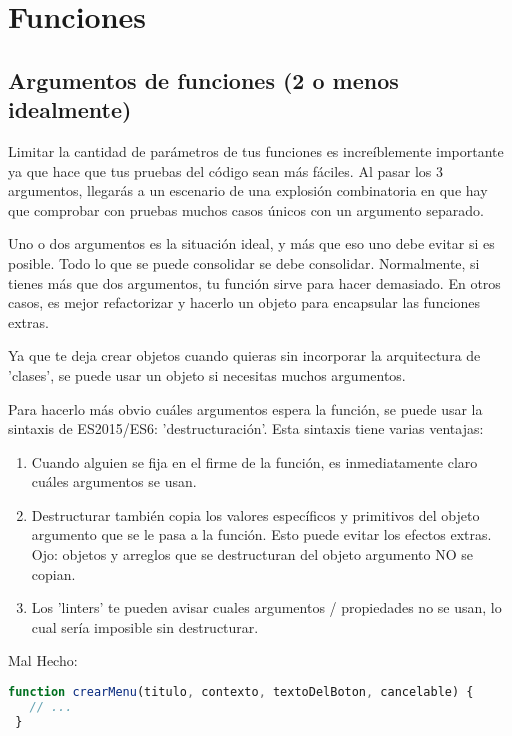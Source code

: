 \section{Funciones}

\subsection*{Argumentos de funciones (2 o menos idealmente)}

Limitar la cantidad de parámetros de tus funciones es increíblemente importante ya que hace que tus pruebas del código sean más fáciles. Al pasar los 3 argumentos, llegarás a un escenario de una explosión combinatoria en que hay que comprobar con pruebas muchos casos únicos con un argumento separado.

Uno o dos argumentos es la situación ideal, y más que eso uno debe evitar si es posible. Todo lo que se puede consolidar se debe consolidar. Normalmente, si tienes más que dos argumentos, tu función sirve para hacer demasiado. En otros casos, es mejor refactorizar y hacerlo un objeto para encapsular las funciones extras.

Ya que  te deja crear objetos cuando quieras sin incorporar la arquitectura de 'clases', se puede usar un objeto si necesitas muchos argumentos.

Para hacerlo más obvio cuáles argumentos espera la función, se puede usar la sintaxis de ES2015/ES6: 'destructuración'. Esta sintaxis tiene varias ventajas:

\begin{enumerate}
  \item Cuando alguien se fija en el firme de la función, es inmediatamente claro cuáles argumentos se usan.
  \item Destructurar también copia los valores específicos y primitivos del objeto argumento que se le pasa a la función. Esto puede evitar los efectos extras. Ojo: objetos y arreglos que se destructuran del objeto argumento NO se copian.
  \item Los 'linters' te pueden avisar cuales argumentos / propiedades no se usan, lo cual sería imposible sin destructurar.
\end{enumerate}
\vspace{0.5cm} %

Mal Hecho:
\begin{lstlisting}[language=TypeScript, style=badstyle]
 function crearMenu(titulo, contexto, textoDelBoton, cancelable) {
   // ...
 }
\end{lstlisting}
\vspace{0.5cm} %


